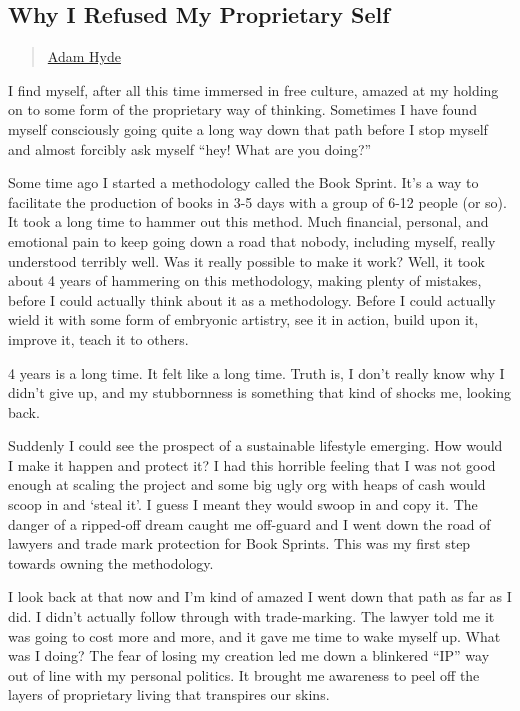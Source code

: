 \subsection{Why I Refused My Proprietary
Self}\label{why-i-refused-my-proprietary-self}

\begin{quote}
\hyperlink{adam-hyde}{Adam Hyde}
\end{quote}

I find myself, after all this time immersed in free culture, amazed at
my holding on to some form of the proprietary way of thinking. Sometimes
I have found myself consciously going quite a long way down that path
before I stop myself and almost forcibly ask myself ``hey! What are you
doing?''

Some time ago I started a methodology called the Book Sprint. It's a way
to facilitate the production of books in 3-5 days with a group of 6-12
people (or so). It took a long time to hammer out this method. Much
financial, personal, and emotional pain to keep going down a road that
nobody, including myself, really understood terribly well. Was it really
possible to make it work? Well, it took about 4 years of hammering on
this methodology, making plenty of mistakes, before I could actually
think about it as a methodology. Before I could actually wield it with
some form of embryonic artistry, see it in action, build upon it,
improve it, teach it to others.

4 years is a long time. It felt like a long time. Truth is, I don't
really know why I didn't give up, and my stubbornness is something that
kind of shocks me, looking back.

Suddenly I could see the prospect of a sustainable lifestyle emerging.
How would I make it happen and protect it? I had this horrible feeling
that I was not good enough at scaling the project and some big ugly org
with heaps of cash would scoop in and `steal it'. I guess I meant they
would swoop in and copy it. The danger of a ripped-off dream caught me
off-guard and I went down the road of lawyers and trade mark protection
for Book Sprints. This was my first step towards owning the methodology.

I look back at that now and I'm kind of amazed I went down that path as
far as I did. I didn't actually follow through with trade-marking. The
lawyer told me it was going to cost more and more, and it gave me time
to wake myself up. What was I doing? The fear of losing my creation led
me down a blinkered ``IP'' way out of line with my personal politics. It
brought me awareness to peel off the layers of proprietary living that
transpires our skins.

